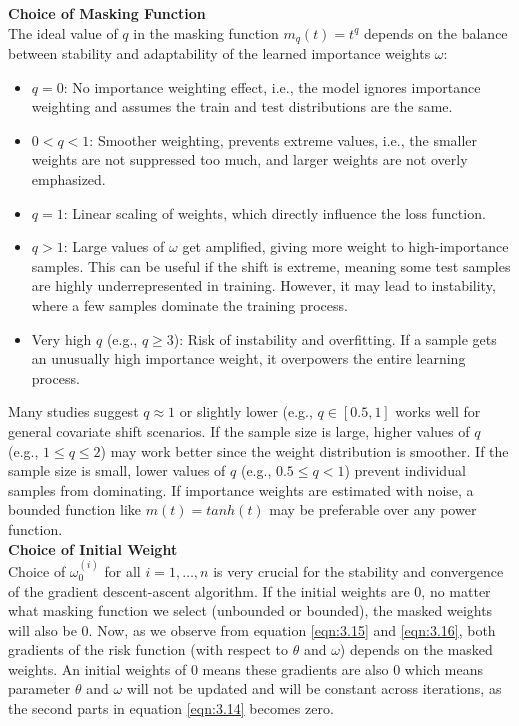 \textbf{Choice of Masking Function}\label{choice-masking-q}\\

The ideal value of $q$ in the masking function $m_q(t) = t^q$ depends on the balance between stability and adaptability of the learned importance weights $\omega$:
\begin{itemize}
    \item $q=0$: No importance weighting effect, i.e., the model ignores importance weighting and assumes the train and test distributions are the same.
    \item $0<q<1$: Smoother weighting, prevents extreme values, i.e., the smaller weights are not suppressed too much, and larger weights are not overly emphasized.
    \item $q=1$: Linear scaling of weights, which directly influence the loss function.
    \item $q>1$: Large values of $\omega$ get amplified, giving more weight to high-importance samples. This can be useful if the shift is extreme, meaning some test samples are highly underrepresented in training. However, it may lead to instability, where a few samples dominate the training process.
    \item Very high $q$ (e.g., $q \geq 3$): Risk of instability and overfitting. If a sample gets an unusually high importance weight, it overpowers the entire learning process.
\end{itemize}

Many studies suggest $q \approx 1$ or slightly lower (e.g., $q \in [0.5, 1]$ works well for general covariate shift scenarios. If the sample size is large, higher values of $q$ (e.g., $1 \leq q \leq 2$) may work better since the weight distribution is smoother. If the sample size is small, lower values of $q$ (e.g., $0.5 \leq q < 1$) prevent individual samples from dominating. If importance weights are estimated with noise, a bounded function like $m(t)=tanh(t)$ may be preferable over any power function.\\

\textbf{Choice of Initial Weight}\\

Choice of $\omega^{(i)}_0$ for all $i = 1, \ldots, n$ is very crucial for the stability and convergence of the gradient descent-ascent algorithm. If the initial weights are $0$, no matter what masking function we select (unbounded or bounded), the masked weights will also be $0$. Now, as we observe from equation \ref{eqn:3.15} and \ref{eqn:3.16}, both gradients of the risk function (with respect to $\theta$ and $\omega$) depends on the masked weights. An initial weights of $0$ means these gradients are also $0$ which means parameter $\theta$ and $\omega$ will not be updated and will be constant across iterations, as the second parts in equation \ref{eqn:3.14} becomes zero.\\

